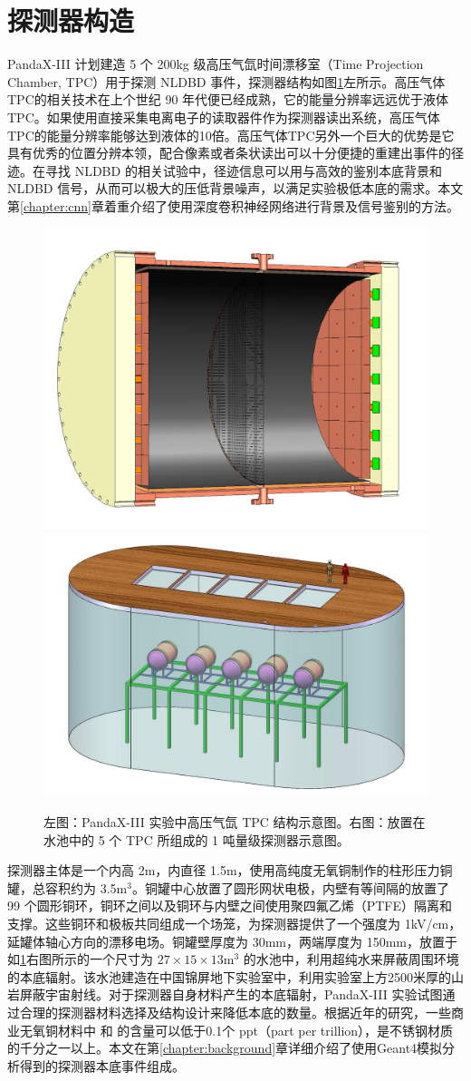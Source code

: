 \section{探测器构造}
\label{section:detector}

PandaX-III 计划建造 5 个 200kg 级高压气氙时间漂移室（Time Projection Chamber, TPC）用于探测 NLDBD 事件，探测器结构如图\ref{fig:detector}左所示。高压气体TPC的相关技术在上个世纪 90 年代便已经成熟，它的能量分辨率远远优于液体TPC。如果使用直接采集电离电子的读取器件作为探测器读出系统，高压气体TPC的能量分辨率能够达到液体的10倍。高压气体TPC另外一个巨大的优势是它具有优秀的位置分辨本领，配合像素或者条状读出可以十分便捷的重建出事件的径迹。在寻找 NLDBD 的相关试验中，径迹信息可以用与高效的鉴别本底背景和 NLDBD 信号，从而可以极大的压低背景噪声，以满足实验极低本底的需求。本文第\ref{chapter:cnn}章着重介绍了使用深度卷积神经网络进行背景及信号鉴别的方法。

\begin{figure}[tbp]
    \centering
    \includegraphics[width=0.4\columnwidth]{pic/fig1.png}
    \includegraphics[width=0.4\columnwidth]{pic/fig2.jpg}
    \caption{左图：PandaX-III 实验中高压气氙 TPC 结构示意图。右图：放置在水池中的 5 个 TPC 所组成的 1 吨量级探测器示意图。\supercite{cdr}}
    \label{fig:detector}
\end{figure}
    
探测器主体是一个内高 2m，内直径 1.5m，使用高纯度无氧铜制作的柱形压力铜罐，总容积约为 3.5m$^3$。铜罐中心放置了圆形网状电极，内壁有等间隔的放置了 99 个圆形铜环，铜环之间以及铜环与内壁之间使用聚四氟乙烯（PTFE）隔离和支撑。这些铜环和极板共同组成一个场笼，为探测器提供了一个强度为 1kV/cm，延罐体轴心方向的漂移电场。铜罐壁厚度为 30mm，两端厚度为 150mm，放置于如\ref{fig:detector}右图所示的一个尺寸为 $27\times15\times13$m$^3$ 的水池中，利用超纯水来屏蔽周围环境的本底辐射。该水池建造在中国锦屏地下实验室中，利用实验室上方2500米厚的山岩屏蔽宇宙射线。对于探测器自身材料产生的本底辐射，PandaX-III 实验试图通过合理的探测器材料选择及结构设计来降低本底的数量。根据近年的研究，一些商业无氧铜材料中 \utte 和 \thttt 的含量可以低于0.1个 ppt（part per trillion）\supercite{abgrall2016majorana}，是不锈钢材质的千分之一以上。本文在第\ref{chapter:background}章详细介绍了使用Geant4模拟分析得到的探测器本底事件组成。

